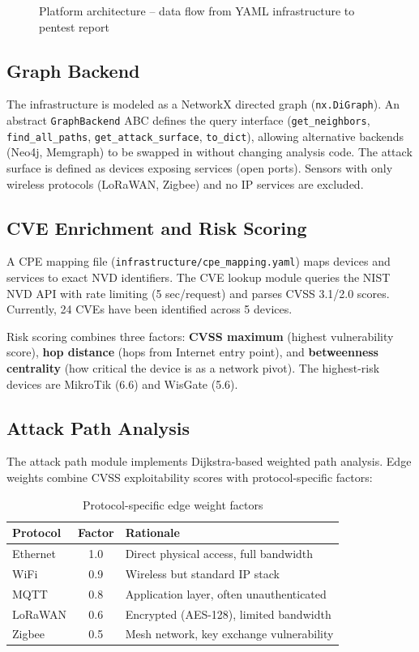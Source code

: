 \documentclass[11pt,a4paper]{article}
\begin{document}
\begin{figure}[H]
\begin{tikzpicture}
\end{tikzpicture}
\caption{Platform architecture -- data flow from YAML infrastructure to pentest report}
\label{fig:architecture}
\end{figure}

\subsection{Graph Backend}

The infrastructure is modeled as a NetworkX directed graph (\texttt{nx.DiGraph}). An abstract \texttt{GraphBackend} ABC defines the query interface (\texttt{get\_neighbors}, \texttt{find\_all\_paths}, \texttt{get\_attack\_surface}, \texttt{to\_dict}), allowing alternative backends (Neo4j, Memgraph) to be swapped in without changing analysis code. The attack surface is defined as devices exposing services (open ports). Sensors with only wireless protocols (LoRaWAN, Zigbee) and no IP services are excluded.

\subsection{CVE Enrichment and Risk Scoring}

A CPE mapping file (\texttt{infrastructure/cpe\_mapping.yaml}) maps devices and services to exact NVD identifiers. The CVE lookup module queries the NIST NVD API with rate limiting (5 sec/request) and parses CVSS 3.1/2.0 scores. Currently, 24 CVEs have been identified across 5 devices.

Risk scoring combines three factors: \textbf{CVSS maximum} (highest vulnerability score), \textbf{hop distance} (hops from Internet entry point), and \textbf{betweenness centrality} (how critical the device is as a network pivot). The highest-risk devices are MikroTik (6.6) and WisGate (5.6).

\subsection{Attack Path Analysis}

The attack path module implements Dijkstra-based weighted path analysis. Edge weights combine CVSS exploitability scores with protocol-specific factors:

\begin{table}[H]
\centering
\begin{tabular}{@{}lcl@{}}
\toprule
\textbf{Protocol} & \textbf{Factor} & \textbf{Rationale} \\
\midrule
Ethernet & 1.0 & Direct physical access, full bandwidth \\
WiFi & 0.9 & Wireless but standard IP stack \\
MQTT & 0.8 & Application layer, often unauthenticated \\
LoRaWAN & 0.6 & Encrypted (AES-128), limited bandwidth \\
Zigbee & 0.5 & Mesh network, key exchange vulnerability \\
\bottomrule
\end{tabular}
\caption{Protocol-specific edge weight factors}
\label{tab:protocols}
\end{table}
\end{document}
